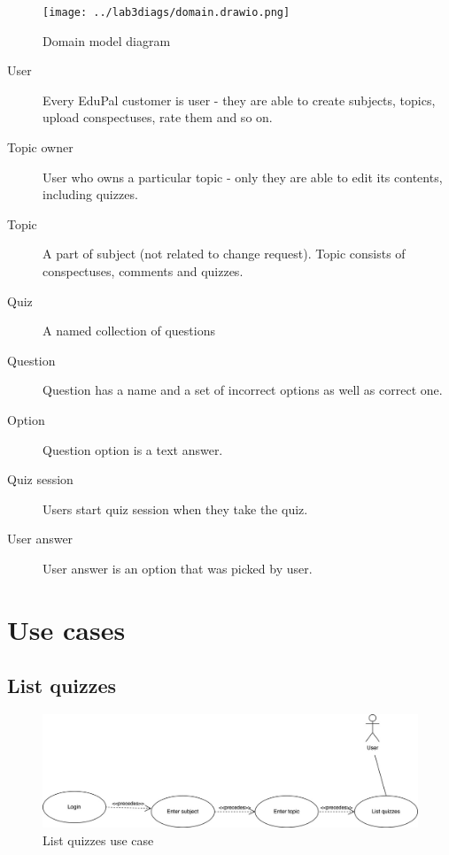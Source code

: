 \documentclass[
    english, %
]{VUMIFPSkursinis}
\begin{document}
\begin{figure}[ht]
    \centering
    \texttt{[image: ../lab3diags/domain.drawio.png]}
    \caption{Domain model diagram}
    \label{domain-model}
\end{figure}

\begin{description}
    \item[User] Every EduPal customer is user - they are able to create subjects, topics, upload conspectuses, rate them and so on.
    \item[Topic owner] User who owns a particular topic - only they are able to edit its contents, including quizzes.
    \item[Topic] A part of subject (not related to change request). Topic consists of conspectuses, comments and quizzes.
    \item[Quiz] A named collection of questions
    \item[Question] Question has a name and a set of incorrect options as well as correct one.
    \item[Option] Question option is a text answer.
    \item[Quiz session] Users start quiz session when they take the quiz.
    \item[User answer] User answer is an option that was picked by user.
\end{description}

\section{Use cases}

\subsection{List quizzes}

\begin{figure}[ht]
    \centering
    \includegraphics[width=\textwidth]{../lab3diags/list.drawio Large.jpeg}
    \caption{List quizzes use case}
    \label{list-quizzes}
\end{figure}
\end{document}
